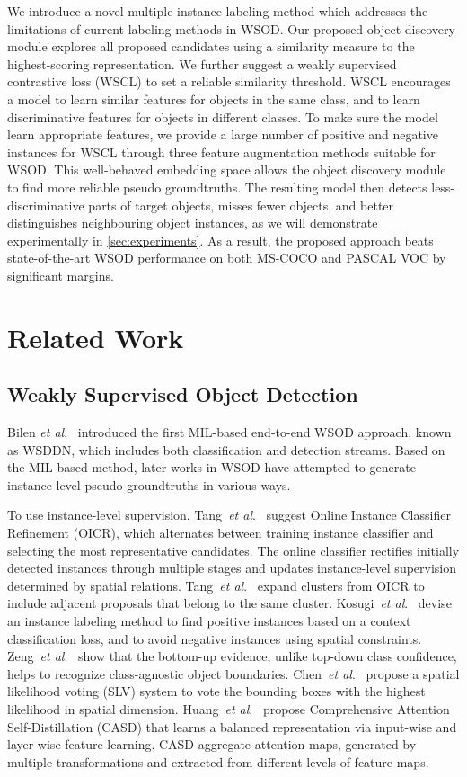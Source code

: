 \documentclass[runningheads]{llncs}
\makeatletter
\DeclareRobustCommand\onedot{\futurelet\@let@token\@onedot}
\def\onedot{.} \def\eg{\emph{e.g}\onedot, } \def\Eg{\emph{E.g}\onedot}
\def\etal{\emph{et al}\onedot}
\makeatother
\begin{document}
We introduce a novel multiple instance labeling method which addresses the limitations of current labeling methods in WSOD.
Our proposed object discovery module explores all proposed candidates using a similarity measure to the highest-scoring representation.
We further suggest a weakly supervised contrastive loss (WSCL) to set a reliable similarity threshold.
WSCL encourages a model to learn similar features for objects in the same class,
and to learn discriminative features for objects in different classes.
To make sure the model learn appropriate features, we provide a large number of positive and negative instances for WSCL through three feature augmentation methods suitable for WSOD.
This well-behaved embedding space allows the object discovery module to find more reliable pseudo groundtruths.
The resulting model then detects less-discriminative parts of target objects, misses fewer objects, and better distinguishes neighbouring object instances, as we will demonstrate experimentally in \cref{sec:experiments}.
As a result, the proposed approach beats state-of-the-art WSOD performance on both MS-COCO and PASCAL VOC by significant margins.

\section{Related Work}
\label{sec:related_work}
\subsection{Weakly Supervised Object Detection}
Bilen \etal~\cite{Bilen_2016_CVPR} introduced the first MIL-based end-to-end WSOD approach, known as WSDDN, which includes both classification and detection streams. 
Based on the MIL-based method, later works in WSOD have attempted to generate instance-level pseudo groundtruths in various ways.


To use instance-level supervision, Tang~\etal~\cite{Tang_2017_CVPR} suggest Online Instance Classifier Refinement (OICR),
which alternates between training instance classifier and selecting the most representative candidates.
The online classifier rectifies initially detected instances through multiple stages and updates instance-level supervision determined by spatial relations. 
Tang~\etal~\cite{tang2018pcl} expand clusters from OICR to include adjacent proposals that belong to the same cluster.
Kosugi~\etal~\cite{Kosugi_2019_ICCV} devise an instance labeling method to find positive instances based on a context classification loss, and to avoid negative instances using spatial constraints.
Zeng~\etal~\cite{zeng2019wsod2} show that the bottom-up evidence, unlike top-down class confidence, helps to recognize class-agnostic object boundaries.
Chen~\etal~\cite{chen2020slv} propose a spatial likelihood voting (SLV) system to vote the bounding boxes with the highest likelihood in spatial dimension.
Huang~\etal~\cite{huang2020comprehensive} propose Comprehensive Attention Self-Distillation (CASD) that learns a balanced representation via input-wise and layer-wise feature learning.
CASD aggregate attention maps, generated by multiple transformations and extracted from different levels of feature maps.
\end{document}
